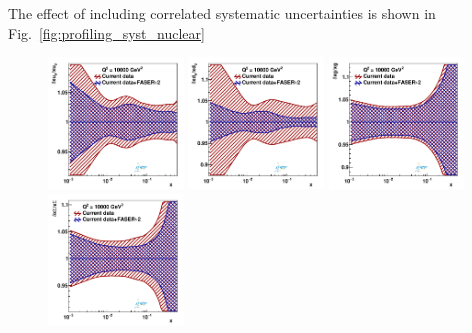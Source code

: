 {\color{red}
The effect of including correlated systematic uncertainties is shown in 
Fig.~\ref{fig:profiling_syst_nuclear}
}


\begin{figure}[t]
\centering
\includegraphics[width=0.32\textwidth]{plots/nuclear_fasernu2/inclusive+charm_chargediscrimination/statOnly_FASERv2_q2_10000_pdf_uv_ratio.pdf}
\includegraphics[width=0.32\textwidth]{plots/nuclear_fasernu2/inclusive+charm_chargediscrimination/statOnly_FASERv2_q2_10000_pdf_dv_ratio.pdf}
\includegraphics[width=0.32\textwidth]{plots/nuclear_fasernu2/inclusive+charm_chargediscrimination/statOnly_FASERv2_q2_10000_pdf_g_ratio.pdf}\\
\includegraphics[width=0.32\textwidth]{plots/nuclear_fasernu2/inclusive+charm_chargediscrimination/statOnly_FASERv2_q2_10000_pdf_Sea_ratio.pdf}

\end{figure}
